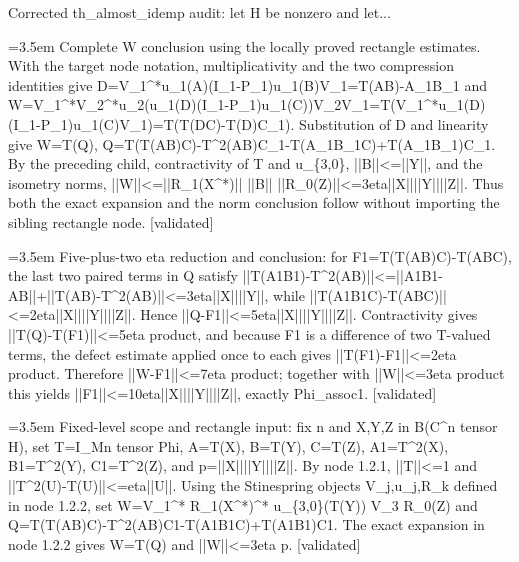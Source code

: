 \documentclass{article}
\newcommand{\step}[1]{\par\noindent\hangindent=3.5em\hangafter=1%
  \makebox[3.5em][l]{\textbf{#1.}}}
\newcommand{\steptag}[1]{\hfill{\small\textsf{[#1]}}}
\begin{document}
\begin{proofbox}{Corrected th\_almost\_idemp audit: let H be nonzero and let...}
\step{1.2.2.3.2} Complete W conclusion using the locally proved rectangle estimates. With the target node notation, multiplicativity and the two compression identities give D=V\_1\textasciicircum{}*u\_1(A)(I\_1-P\_1)u\_1(B)V\_1=T(AB)-A\_1B\_1 and W=V\_1\textasciicircum{}*V\_2\textasciicircum{}*u\_2(u\_1(D)(I\_1-P\_1)u\_1(C))V\_2V\_1=T(V\_1\textasciicircum{}*u\_1(D)(I\_1-P\_1)u\_1(C)V\_1)=T(T(DC)-T(D)C\_1). Substitution of D and linearity give W=T(Q), Q=T(T(AB)C)-T\textasciicircum{}2(AB)C\_1-T(A\_1B\_1C)+T(A\_1B\_1)C\_1. By the preceding child, contractivity of T and u\_\{3,0\}, ||B||<=||Y||, and the isometry norms, ||W||<=||R\_1(X\textasciicircum{}*)|| ||B|| ||R\_0(Z)||<=3eta||X||||Y||||Z||. Thus both the exact expansion and the norm conclusion follow without importing the sibling rectangle node. \steptag{validated} \\[4pt]
\step{1.2.3} Five-plus-two eta reduction and conclusion: for F1=T(T(AB)C)-T(ABC), the last two paired terms in Q satisfy ||T(A1B1)-T\textasciicircum{}2(AB)||<=||A1B1-AB||+||T(AB)-T\textasciicircum{}2(AB)||<=3eta||X||||Y||, while ||T(A1B1C)-T(ABC)||<=2eta||X||||Y||||Z||. Hence ||Q-F1||<=5eta||X||||Y||||Z||. Contractivity gives ||T(Q)-T(F1)||<=5eta product, and because F1 is a difference of two T-valued terms, the defect estimate applied once to each gives ||T(F1)-F1||<=2eta product. Therefore ||W-F1||<=7eta product; together with ||W||<=3eta product this yields ||F1||<=10eta||X||||Y||||Z||, exactly Phi\_assoc1. \steptag{validated} \\[6pt]
\step{1.2.3.1} Fixed-level scope and rectangle input: fix n and X,Y,Z in B(C\textasciicircum{}n tensor H), set T=I\_Mn tensor Phi, A=T(X), B=T(Y), C=T(Z), A1=T\textasciicircum{}2(X), B1=T\textasciicircum{}2(Y), C1=T\textasciicircum{}2(Z), and p=||X||||Y||||Z||. By node 1.2.1, ||T||<=1 and ||T\textasciicircum{}2(U)-T(U)||<=eta||U||. Using the Stinespring objects V\_j,u\_j,R\_k defined in node 1.2.2, set W=V\_1\textasciicircum{}* R\_1(X\textasciicircum{}*)\textasciicircum{}* u\_\{3,0\}(T(Y)) V\_3 R\_0(Z) and Q=T(T(AB)C)-T\textasciicircum{}2(AB)C1-T(A1B1C)+T(A1B1)C1. The exact expansion in node 1.2.2 gives W=T(Q) and ||W||<=3eta p. \steptag{validated} \\[6pt]

\end{proofbox}
\end{document}
